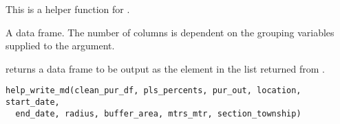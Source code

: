 \documentclass[a4paper]{book}
\begin{document}
%
\begin{Details}\relax
This is a helper function for .
\end{Details}
%
\begin{Value}
A data frame. The number of columns is dependent on the grouping
variables supplied to the  argument.
\end{Value}
%
\begin{Description}\relax
{} returns a data frame to be output as the 
element in the list returned from .
\end{Description}
%
\begin{Usage}
\begin{verbatim}
help_write_md(clean_pur_df, pls_percents, pur_out, location, start_date,
  end_date, radius, buffer_area, mtrs_mtr, section_township)
\end{verbatim}
\end{Usage}
%
\end{document}
